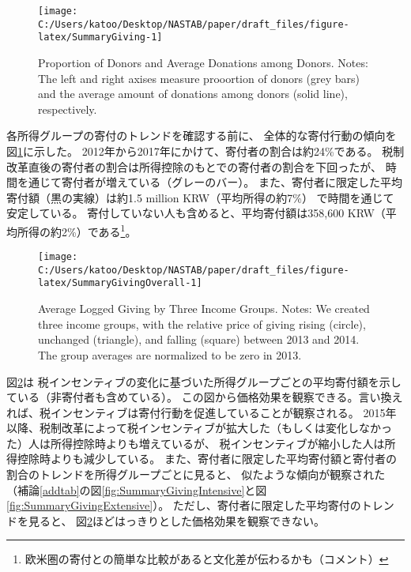 \documentclass[
  11pt,
  a4paper,
]{article}
\begin{document}
\begin{figure}[t]

{\centering \texttt{[image: C:/Users/katoo/Desktop/NASTAB/paper/draft\_files/figure-latex/SummaryGiving-1]} 

}

\caption{Proportion of Donors and Average Donations among Donors. Notes: The left and right axises measure prooortion of donors (grey bars) and the average amount of donations among donors (solid line), respectively.}\label{fig:SummaryGiving}
\end{figure}

各所得グループの寄付のトレンドを確認する前に、
全体的な寄付行動の傾向を図\ref{fig:SummaryGiving}に示した。
2012年から2017年にかけて、寄付者の割合は約24\%である。
税制改革直後の寄付者の割合は所得控除のもとでの寄付者の割合を下回ったが、
時間を通じて寄付者が増えている（グレーのバー）。
また、寄付者に限定した平均寄付額（黒の実線）は約1.5 million KRW（平均所得の約7\%）
で時間を通じて安定している。
寄付していない人も含めると、平均寄付額は358,600 KRW（平均所得の約2\%）である\footnote{欧米圏の寄付との簡単な比較があると文化差が伝わるかも（コメント）}。

\begin{figure}[t]

{\centering \texttt{[image: C:/Users/katoo/Desktop/NASTAB/paper/draft\_files/figure-latex/SummaryGivingOverall-1]} 

}

\caption{Average Logged Giving by Three Income Groups. Notes: We created three income groups, with the relative price of giving rising (circle), unchanged (triangle), and falling (square) between 2013 and 2014. The group averages are normalized to be zero in 2013.}\label{fig:SummaryGivingOverall}
\end{figure}

図\ref{fig:SummaryGivingOverall}は
税インセンティブの変化に基づいた所得グループごとの平均寄付額を示している（非寄付者も含めている）。
この図から価格効果を観察できる。言い換えれば、税インセンティブは寄付行動を促進していることが観察される。
2015年以降、税制改革によって税インセンティブが拡大した（もしくは変化しなかった）人は所得控除時よりも増えているが、
税インセンティブが縮小した人は所得控除時よりも減少している。
また、寄付者に限定した平均寄付額と寄付者の割合のトレンドを所得グループごとに見ると、
似たような傾向が観察された
（補論\ref{addtab}の図\ref{fig:SummaryGivingIntensive}と図\ref{fig:SummaryGivingExtensive}）。
ただし、寄付者に限定した平均寄付のトレンドを見ると、
図\ref{fig:SummaryGivingOverall}ほどはっきりとした価格効果を観察できない。
\end{document}
